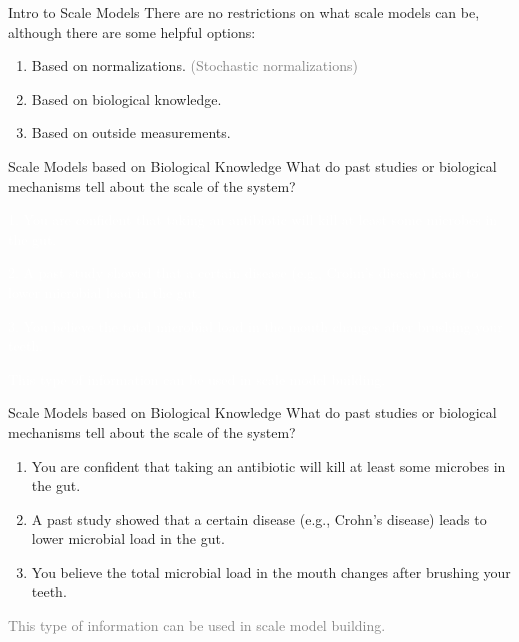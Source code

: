 \documentclass[
  ignorenonframetext,
]{beamer}
\providecommand{\tightlist}{%
  \setlength{\itemsep}{0pt}\setlength{\parskip}{0pt}}
\begin{document}
\begin{frame}{Intro to Scale Models}
\protect\hypertarget{intro-to-scale-models}{}
There are no restrictions on what scale models can be, although there
are some helpful options:

\vspace{.125in}

\begin{enumerate}
\tightlist
\item
  Based on normalizations. \textcolor{gray}{(Stochastic normalizations)}
\item
  Based on biological knowledge.
\item
  Based on outside measurements.
\end{enumerate}
\end{frame}

\begin{frame}{Scale Models based on Biological Knowledge}
\protect\hypertarget{scale-models-based-on-biological-knowledge}{}
What do past studies or biological mechanisms tell about the scale of
the system?

\vspace{.1in}

\textcolor{white}{1. You are confident that taking an antibiotic will kill at least some microbes in the gut.}

\textcolor{white}{2. A past study showed that a certain disease (e.g., Crohn's disease) leads to lower microbial load in the gut.}

\textcolor{white}{3. You believe the total microbial load in the mouth changes after brushing your teeth.}

\textcolor{white}{This type of information can be used in scale model building.}
\end{frame}

\begin{frame}{Scale Models based on Biological Knowledge}
\protect\hypertarget{scale-models-based-on-biological-knowledge-1}{}
What do past studies or biological mechanisms tell about the scale of
the system?

\vspace{.1in}

\begin{enumerate}
\item
  You are confident that taking an antibiotic will kill at least some
  microbes in the gut.
\item
  A past study showed that a certain disease (e.g., Crohn's disease)
  leads to lower microbial load in the gut.
\item
  You believe the total microbial load in the mouth changes after
  brushing your teeth.
\end{enumerate}

\textcolor{gray}{This type of information can be used in scale model building.}
\end{frame}
\end{document}
